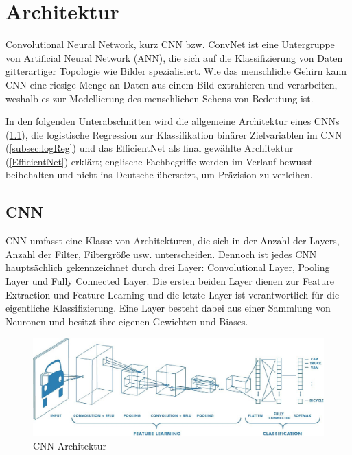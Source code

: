 \section{Architektur}

Convolutional Neural Network, kurz CNN bzw. ConvNet ist eine Untergruppe von Artificial Neural Network (ANN),  die sich auf die Klassifizierung von Daten gitterartiger Topologie wie Bilder spezialisiert. Wie das menschliche Gehirn kann CNN eine riesige Menge an Daten aus einem Bild extrahieren und verarbeiten, weshalb es zur Modellierung des menschlichen Sehens von Bedeutung ist. 

In den folgenden Unterabschnitten wird die allgemeine Architektur eines CNNs (\ref{CNN}), die logistische Regression zur Klassifikation binärer Zielvariablen im CNN (\ref{subsec:logReg}) und das EfficientNet als final gewählte Architektur (\ref{EfficientNet}) erklärt; englische Fachbegriffe werden im Verlauf bewusst beibehalten und nicht ins Deutsche übersetzt, um Präzision zu verleihen.

\subsection{CNN} \label{CNN}
CNN umfasst eine Klasse von Architekturen, die sich in der Anzahl der Layers, Anzahl der Filter, Filtergröße usw. unterscheiden. Dennoch ist jedes CNN hauptsächlich gekennzeichnet durch drei Layer: Convolutional Layer, Pooling Layer und Fully Connected Layer. Die ersten beiden Layer dienen zur Feature Extraction und Feature Learning und die letzte Layer ist verantwortlich für die eigentliche Klassifizierung. Eine Layer besteht dabei aus einer Sammlung von Neuronen und besitzt ihre eigenen Gewichten und Biases.


\begin{figure}[H]
\centering
\includegraphics[width=0.8\linewidth]{pic/Klassifikation/CNN-Architektur.jpeg}
\caption{\label{pic:cnn} CNN Architektur}
\end{figure}



